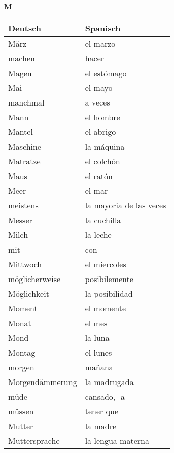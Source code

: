 \begin{flushright}\begin{Huge}\textbf{M}\end{Huge}\end{flushright}

\begin{longtable}{p{} p{}} 
\textbf{Deutsch}     & \textbf{Spanisch}                                       \\ \hline
\hline
\endhead %
März & el marzo\\
machen & hacer\\
Magen & el estómago\\
Mai & el mayo\\
manchmal & a veces\\
Mann & el hombre\\
Mantel & el abrigo\\
Maschine & la máquina\\
Matratze & el colchón\\
Maus & el ratón\\
Meer & el mar\\
meistens & la mayoria de las veces\\
Messer & la cuchilla\\
Milch & la leche\\
mit & con\\
Mittwoch & el miercoles\\
möglicherweise & posibilemente\\
Möglichkeit & la posibilidad\\
Moment & el momente \\
Monat & el mes\\
Mond & la luna\\
Montag & el lunes \\
morgen & mañana\\
Morgendämmerung & la madrugada\\
müde & cansado, -a\\
müssen & tener que\\
Mutter & la madre\\
Muttersprache & la lengua materna\\

\end{longtable}
